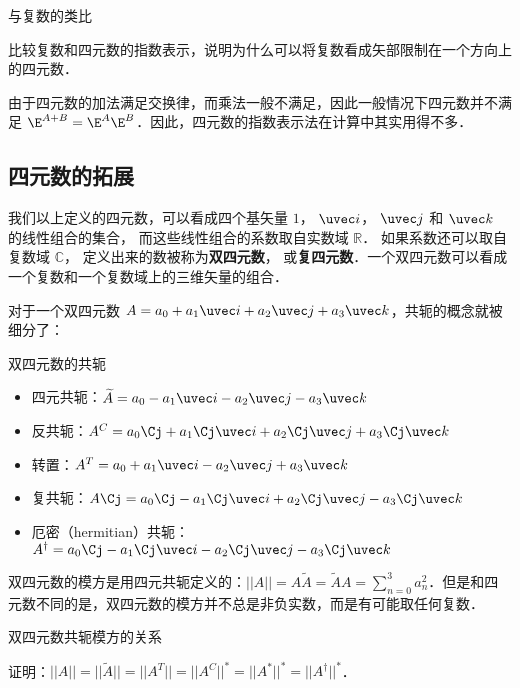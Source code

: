 \begin{exercise}{与复数的类比}

比较复数和四元数的指数表示，说明为什么可以将复数看成矢部限制在一个方向上的四元数．

\end{exercise}

由于四元数的加法满足交换律，而乘法一般不满足，因此一般情况下四元数并不满足 $\E^{A+B} = \E^A \E^B$．因此，四元数的指数表示法在计算中其实用得不多．

\subsection{四元数的拓展}

我们以上定义的四元数，可以看成四个基矢量 $1$， $\uvec i$， $\uvec j$ 和 $\uvec k$ 的线性组合的集合， 而这些线性组合的系数取自实数域 $\mathbb R$． 如果系数还可以取自复数域 $\mathbb C$， 定义出来的数被称为\textbf{双四元数}， 或\textbf{复四元数}．一个双四元数可以看成一个复数和一个复数域上的三维矢量的组合．

对于一个双四元数 $A=a_0+a_1 \uvec i+a_2\uvec j+a_3\uvec k$，共轭的概念就被细分了：

\begin{definition}{双四元数的共轭}
\begin{itemize}
\item 四元共轭：$\widetilde{A}=a_0-a_1\uvec i-a_2\uvec j-a_3\uvec k$
\item 反共轭：$A^C=a_0\Cj + a_1\Cj\uvec i+a_2\Cj\uvec j+a_3\Cj\uvec k$
\item 转置：$A^T=a_0+a_1\uvec i-a_2\uvec j+a_3\uvec k$
\item 复共轭：$A\Cj=a_0\Cj-a_1\Cj\uvec i+a_2\Cj\uvec j-a_3\Cj\uvec k$
\item 厄密（hermitian）共轭：$A^\dagger=a_0\Cj-a_1\Cj\uvec i-a_2\Cj\uvec j-a_3\Cj\uvec k$
\end{itemize}
\end{definition}

双四元数的模方是用四元共轭定义的：$||A||=A\widetilde{A}=\widetilde{A}A=\sum^{3}_{n=0}a^2_n$．但是和四元数不同的是，双四元数的模方并不总是非负实数，而是有可能取任何复数．

\begin{exercise}{双四元数共轭模方的关系}

证明：$||A||=||\widetilde{A}||=||A^T||=||A^C||^*=||A^*||^*=||A^\dagger||^*$．

\end{exercise}

